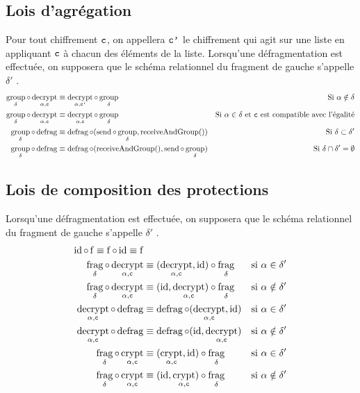 \documentclass[french]{article}
\DeclareMathOperator{\frag}{frag}
\DeclareMathOperator{\defrag}{defrag}
\DeclareMathOperator{\crypt}{crypt}
\DeclareMathOperator{\decrypt}{decrypt}
\DeclareMathOperator{\group}{group}
\DeclareMathOperator{\id}{id}
\DeclareMathOperator{\send}{send}
\DeclareMathOperator{\rec}{receiveAndGroup}
\newcommand\typeT[1]{\text{\ttfamily #1}}
\newcommand{\decryptArgs}[2]{\decrypt_{#1 , \typeT{#2}}}
\newcommand{\cryptArgs}[2]{\crypt_{#1 , \typeT{#2}}}
\newcommand{\decryptCAlpha}{\decryptArgs{\alpha}{c}}
\newcommand{\cryptCAlpha}{\cryptArgs{\alpha}{c}}
\newcommand{\ch}{\typeT{c}}
\newcommand{\chp}{\typeT{c'}}
\newcommand{\groupDelta}{\group_{\delta}}
\newcommand{\fragDelta}{\frag_{\delta}}
\begin{document}
\subsection*{Lois d'agrégation}
Pour tout chiffrement $\ch$,
on appellera $\chp$
le chiffrement qui agit sur une liste en appliquant
$\ch$ à chacun des éléments de la liste.
Lorsqu'une défragmentation est effectuée, on supposera que le schéma relationnel
du fragment de gauche s'appelle $\delta'$ .
\begin{align}
\groupDelta \circ \decryptCAlpha
& \equiv \decryptArgs{\alpha}{\chp} \circ \groupDelta
& \text{Si $\alpha \notin \delta$} \\
\groupDelta \circ \decryptCAlpha
& \equiv \decryptCAlpha \circ \groupDelta
& \text{Si $\alpha \in \delta$ et $\ch$ est compatible avec l'égalité} \\
\groupDelta \circ \defrag 
& \equiv \defrag \circ (\send\circ\groupDelta, \rec())
& \text{Si $\delta \subset \delta'$} \\
\groupDelta \circ \defrag 
& \equiv \defrag \circ (\rec(), \send\circ\groupDelta)
& \text{Si $\delta \cap \delta' = \emptyset$} 
\end{align}

\subsection*{Lois de composition des protections}
Lorsqu'une défragmentation est effectuée, on supposera que le schéma relationnel
du fragment de gauche s'appelle $\delta'$ .
\begin{align}
\id \circ \operatorname{f}
\equiv \operatorname{f} \circ \id
\equiv \operatorname{f} \\
\fragDelta \circ \decryptCAlpha
& \equiv (\decryptCAlpha, \id) \circ \fragDelta
& \text{si $\alpha \in \delta'$} \\
\fragDelta \circ \decryptCAlpha
& \equiv (\id, \decryptCAlpha) \circ \fragDelta
& \text{si $\alpha \notin \delta'$} \\
\decryptCAlpha \circ \defrag 
& \equiv \defrag \circ (\decryptCAlpha, \id)
& \text{si $\alpha \in \delta'$} \\
\decryptCAlpha \circ \defrag 
& \equiv \defrag \circ (\id, \decryptCAlpha)
& \text{si $\alpha \notin \delta'$} \\
\fragDelta \circ \cryptCAlpha
& \equiv (\cryptCAlpha, \id) \circ\fragDelta 
& \text{si $\alpha \in \delta'$} \\
\fragDelta \circ \cryptCAlpha
& \equiv (\id, \cryptCAlpha) \circ\fragDelta 
& \text{si $\alpha \notin \delta'$}
\end{align}
\end{document}
